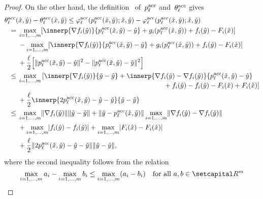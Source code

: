 \documentclass[../main]{subfiles}
\begin{document}
\begin{proof}
    On the other hand, the definition~ of~$p^{\mathrm{acc}}_\ell$ and~$\theta^{\mathrm{acc}}_\ell$ gives
    \begin{align}
        \MoveEqLeft \theta^\acc_\ell(\hat{x}, \hat{y}) - \theta^\acc_\ell(\check{x}, \check{y}) \le \varphi^\acc_\ell(p^\acc_\ell(\check{x}, \check{y}); \hat{x}, \hat{y}) - \varphi^\acc_\ell(p^\acc_\ell(\check{x}, \check{y}); \check{x}, \check{y})  \\
        ={} & \max_{i = 1, \dots, m} [\innerp{\nabla f_i(\hat{y})}{p^\acc_\ell(\check{x}, \check{y}) - \hat{y}} + g_i(p^\acc_\ell(\check{x}, \check{y})) + f_i(\hat{y}) - F_i(\hat{x})] \\
            &- \max_{i = 1, \dots, m} [\innerp{\nabla f_i(\check{y})}{p^\acc_\ell(\check{x}, \check{y}) - \check{y}} + g_i(p^\acc_\ell(\check{x}, \check{y})) + f_i(\check{y}) - F_i(\check{x})] \\
           &+ \frac{\ell}{2} \Big[ \norm{p^\acc_\ell(\check{x}, \check{y}) - \hat{y}}^2 - \norm{p^\acc_\ell(\check{x}, \check{y}) - \check{y}}^2 \Big] \\
       \le{} & \max_{i = 1, \dots, m} 
       \begin{multlined}[t]
           [ \innerp{\nabla f_i(\check{y})}{\check{y} - \hat{y}} + \innerp{\nabla f_i(\hat{y}) - \nabla f_i(\check{y})}{p^\acc_\ell(\check{x}, \check{y}) - \hat{y}} \\
           + f_i(\hat{y}) - f_i(\check{y}) - F_i(\hat{x}) + F_i(\check{x}) ]
       \end{multlined} \\
             &+ \frac{\ell}{2} \innerp{2 p^\acc_\ell(\check{x}, \check{y}) - \hat{y} - \check{y}}{\check{y} - \hat{y}} \\
       \le{} & \max_{i = 1, \dots, m} \norm{\nabla f_i(\check{y})} \norm{\hat{y} - \check{y}} + \norm{\hat{y} - p^\acc_\ell(\check{x}, \check{y})} \max_{i = 1, \dots, m} \norm{\nabla f_i(\hat{y}) - \nabla f_i(\check{y})} \\
             &+ \max_{i = 1, \dots, m} \abs{f_i(\hat{y}) - f_i(\check{y})} + \max_{i = 1, \dots, m} \abs{F_i(\hat{x}) - F_i(\check{x})} \\
             &+ \frac{\ell}{2} \norm{2 p^\acc_\ell(\check{x}, \check{y}) - \hat{y} - \check{y}} \norm{\hat{y} - \check{y}}
   ,\end{align}
   where the second inequality follows from the relation
   \begin{equation}
       \max_{i = 1, \dots, m} a_i - \max_{i = 1, \dots, m} b_i \le \max_{i = 1, \dots, m} (a_i - b_i) \forallcondition{a, b \in \setR^m}

\end{equation}
\end{proof}
\end{document}
